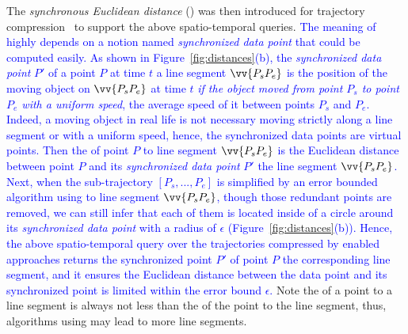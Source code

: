 The \emph{synchronous Euclidean distance} (\sed) was then introduced for trajectory compression~\cite{Meratnia:Spatiotemporal,Potamias:Sampling,Muckell:Compression,Chen:Fast} to support the above spatio-temporal queries.
\textcolor{blue}{The meaning of \sed highly depends on a notion named \emph{synchronized data point} \cite{Meratnia:Spatiotemporal} that could be computed easily. As shown in Figure~\ref{fig:distances}(b), the \emph{synchronized data point} $P'$ of a point $P$ at time $t$ \wrt a line segment $\vv{P_sP_e}$  is the position of the moving object on $\vv{P_sP_e}$ at time $t$ \emph{if the object moved from point $P_s$ to point $P_e$ with a uniform speed}, \ie the average speed of it between points $P_s$ and $P_e$.}
\textcolor{blue}{Indeed, a moving object in real life is not necessary moving strictly along a line segment or with a uniform speed, hence, the synchronized data points are virtual points.}
\textcolor{blue}{Then the \sed of point $P$ to line segment $\vv{P_sP_e}$ is the Euclidean distance between point $P$ and its \emph{synchronized data point} $P'$  \wrt the line segment $\vv{P_sP_e}$.}
\textcolor{blue}{Next, when the sub-trajectory $[P_s, ..., P_e]$ is simplified by an error bounded \lsa algorithm using \sed to line segment $\vv{P_sP_e}$, though those redundant points are removed, we can still infer that each of them is located inside of a circle around its \emph{synchronized data point} with a radius of $\epsilon$ (Figure~\ref{fig:distances}(b)).}
\textcolor{blue}{Hence, the above spatio-temporal query over the trajectories compressed by \sed enabled approaches returns the synchronized point $P'$ of point $P$ \wrt the corresponding line segment, and it ensures the Euclidean distance between the data point and its synchronized point is limited within the error bound $\epsilon$.}
%
Note the \sed of a point to a line segment is always not less than the \ped of the point to the line segment, thus, \lsa algorithms using \sed may lead to more line segments.


